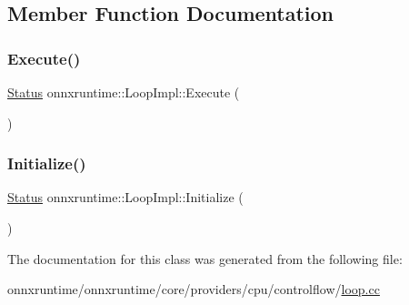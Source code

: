 \subsection{Member Function Documentation}
\mbox{\label{classonnxruntime_1_1LoopImpl_a4a7ddb8fecbb04ab5e9b37eb2e88b366}} 
\subsubsection{\texorpdfstring{Execute()}{Execute()}}
{\footnotesize\ttfamily \mbox{\hyperlink{classonnxruntime_1_1common_1_1Status}{Status}} onnxruntime\+::\+Loop\+Impl\+::\+Execute (\begin{DoxyParamCaption}{ }\end{DoxyParamCaption})}

\mbox{\label{classonnxruntime_1_1LoopImpl_a8611abe8455986416550b0b56d992880}} 
\subsubsection{\texorpdfstring{Initialize()}{Initialize()}}
{\footnotesize\ttfamily \mbox{\hyperlink{classonnxruntime_1_1common_1_1Status}{Status}} onnxruntime\+::\+Loop\+Impl\+::\+Initialize (\begin{DoxyParamCaption}{ }\end{DoxyParamCaption})}



The documentation for this class was generated from the following file\+:\begin{DoxyCompactItemize}
\item 
onnxruntime/onnxruntime/core/providers/cpu/controlflow/\mbox{\hyperlink{loop_8cc}{loop.\+cc}}\end{DoxyCompactItemize}
